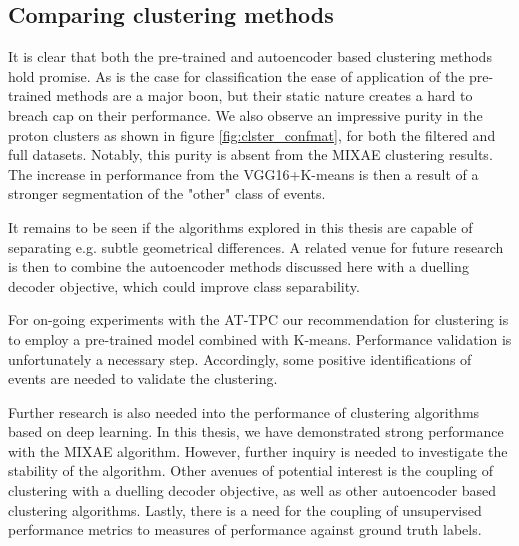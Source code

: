 \subsection{Comparing clustering methods}

It is clear that both the pre-trained and autoencoder based clustering methods hold promise. As is the case for classification the ease of application of the pre-trained methods are a major boon, but their static nature creates a hard to breach cap on their performance. We also observe an impressive purity in the proton clusters as shown in figure \ref{fig:clster_confmat}, for both the filtered and full datasets. Notably, this purity is absent from the MIXAE clustering results. The increase in performance from the VGG16+K-means is then a result of a stronger segmentation of the "other" class of events.

It remains to be seen if the algorithms explored in this thesis are capable of separating e.g. subtle geometrical differences. A related venue for future research is then to combine the autoencoder methods discussed here with a duelling decoder objective, which could improve class separability.

For on-going experiments with the AT-TPC our recommendation for clustering is to employ a pre-trained model combined with K-means. Performance validation is unfortunately a necessary step. Accordingly, some positive identifications of events are needed to validate the clustering. 

Further research is also needed into the performance of clustering algorithms based on deep learning. In this thesis, we have demonstrated strong performance with the MIXAE algorithm. However, further inquiry is needed to investigate the stability of the algorithm. Other avenues of potential interest is the coupling of clustering with a duelling decoder objective, as well as other autoencoder based clustering algorithms. Lastly, there is a need for the coupling of unsupervised performance metrics to measures of performance against ground truth labels.  

